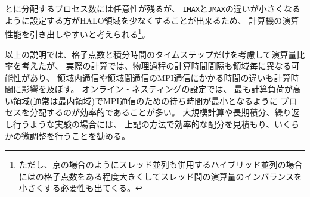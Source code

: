 
{\XDIR} と{\YDIR}に分配するプロセス数には任意性が残るが、
\verb|IMAX|と\verb|JMAX|の違いが小さくなるように設定する方がHALO領域を少なくすることが出来るため、
計算機の演算性能を引き出しやすいと考えられる\footnote{ただし、京の場合のようにスレッド並列も併用するハイブリッド並列の場合には{\YDIR}の格子点数をある程度大きくしてスレッド間の演算量のインバランスを小さくする必要性も出てくる。}。


以上の説明では、格子点数と積分時間のタイムステップだけを考慮して演算量比率を考えたが、
実際の計算では、物理過程の計算時間間隔も領域毎に異なる可能性があり、
領域内通信や領域間通信のMPI通信にかかる時間の違いも計算時間に影響を及ぼす。
オンライン・ネスティングの設定では、
最も計算負荷が高い領域(通常は最内領域)でMPI通信のための待ち時間が最小となるように
プロセスを分配するのが効率的であることが多い。
大規模計算や長期積分、繰り返し行うような実験の場合には、
上記の方法で効率的な配分を見積もり、いくらかの微調整を行うことを勧める。



